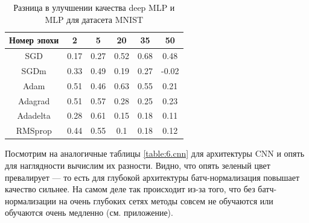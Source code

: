 \documentclass[12pt]{article}
\begin{document}
\begin{table}[h!]
\centering

\begin{minipage}{0.45\linewidth}

\begin{tabular}{|c|c|c|c|c|c|}\hline
\textbf{Номер эпохи} & \textbf{2} & \textbf{5} & \textbf{20} & \textbf{35} & \textbf{50} \\\hline
SGD & \color{green}0.17 & \color{green}0.27 & \color{green}0.52 & \color{green}0.68 & \color{green}0.48 \\\hline

SGDm & \color{green}0.33 & \color{green}0.49 & \color{green}0.19 & \color{green}0.27 & \color{red}-0.02 \\\hline

Adam & \color{green}0.51 & \color{green}0.46 & \color{green}0.63 & \color{green}0.55 & \color{green}0.21 \\\hline

Adagrad & \color{green}0.51 & \color{green}0.57 & \color{green}0.28 & \color{green}0.25 & \color{green}0.23 \\\hline

Adadelta & \color{green}0.28 & \color{green}0.61 & \color{green}0.15 & \color{green}0.18 & \color{green}0.11 \\\hline

RMSprop & \color{green}0.44 & \color{green}0.55 & \color{green}0.1 & \color{green}0.18 & \color{green}0.12 \\\hline

\end{tabular}
\end{minipage}
\caption{\small Разница в улучшении качества deep MLP и MLP для датасета MNIST} \label{table:deep.minus.mlp}
\end{table}

\newpage

Посмотрим на аналогичные таблицы \ref{table:6.cnn} для архитектуры CNN и опять для наглядности вычислим их разности. Видно, что опять зеленый цвет превалирует --- то есть для глубокой архитектуры батч-нормализация повышает качество сильнее. На самом деле так происходит из-за того, что без батч-нормализации на очень глубоких сетях методы совсем не обучаются или обучаются очень медленно (см. приложение).
\end{document}

